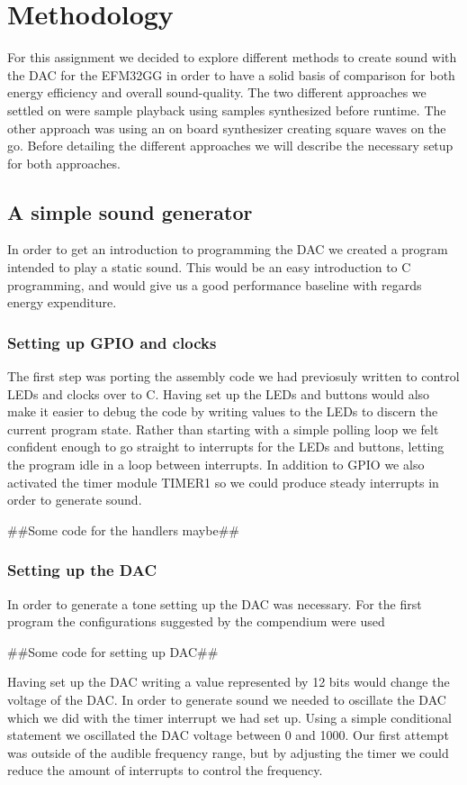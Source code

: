 \chapter{Methodology}

For this assignment we decided to explore different methods to create sound with the DAC for the EFM32GG in order to have a solid basis of comparison for both energy efficiency and overall sound-quality. The two different approaches we settled on were sample playback using samples synthesized before runtime. The other approach was using an on board synthesizer creating square waves on the go. Before detailing the different approaches we will describe the necessary setup for both approaches.

\section{A simple sound generator}
In order to get an introduction to programming the DAC we created a program intended to play a static sound. This would be an easy introduction to C programming, and would give us a good performance baseline with regards energy expenditure.

\subsection{Setting up GPIO and clocks} 
The first step was porting the assembly code we had previosuly written to control LEDs and clocks over to C. Having set up the LEDs and buttons would also make it easier to debug the code by writing values to the LEDs to discern the current program state. Rather than starting with a simple polling loop we felt confident enough to go straight to interrupts for the LEDs and buttons, letting the program idle in a loop between interrupts. In addition to GPIO we also activated the timer module TIMER1 so we could produce steady interrupts in order to generate sound.

##Some code for the handlers maybe##

\subsection{Setting up the DAC}
In order to generate a tone setting up the DAC was necessary. For the first program the configurations suggested by the compendium were used

##Some code for setting up DAC##

Having set up the DAC writing a value represented by 12 bits would change the voltage of the DAC. In order to generate sound we needed to oscillate the DAC which we did with the timer interrupt we had set up. Using a simple conditional statement we oscillated the DAC voltage between 0 and 1000. Our first attempt was outside of the audible frequency range, but by adjusting the timer we could reduce the amount of interrupts to control the frequency.

